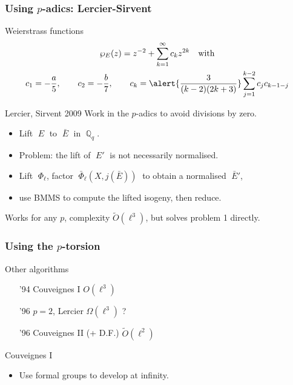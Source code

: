 \documentclass[10pt]{beamer}
\newcommand{\Q}{\mathbb{Q}}  %
\newcommand{\0}{\mathcal{O}}  %
\newcommand{\tildO}{\tilde{O}}  %
\begin{document}
\begin{frame}
  \frametitle{Using $p$-adics: Lercier-Sirvent}

  \begin{block}{Weierstrass functions}
    \vspace{-3mm}
    \begin{gather*}
      \wp_E(z) = z^{-2} + \sum_{k=1}^{\infty}c_kz^{2k} \quad\text{with}\\
      c_1 = -\frac{a}{5}, \qquad c_2 = -\frac{b}{7}, 
      \qquad c_k = \alert{\frac{3}{(k-2)(2k+3)}}\sum_{j=1}^{k-2}c_jc_{k-1-j}
    \end{gather*}
  \end{block}

  \begin{block}{Lercier, Sirvent 2009}
    Work in the $p$-adics to avoid divisions by zero.
    \begin{itemize}
    \item Lift $\;E\;$ to $\;\bar{E}\;$ in $\;\Q_q\;$.
    \item Problem: the lift of $\;E'\;$ is not necessarily normalised.
    \item Lift $\;\Phi_\ell$, factor $\;\bar{\Phi}_\ell(X,j(\bar{E}))\;$ to
      obtain a normalised $\;\bar{E}'$,
    \item use BMMS to compute the lifted isogeny, then reduce.
    \end{itemize}
    Works for any $p$, complexity $\tildO(\ell^3)$, but solves problem
    1 directly.
  \end{block}
\end{frame}


\begin{frame}
  \frametitle{Using the $p$-torsion}

  \begin{block}{Other algorithms}
    \begin{itemize}
    \item['94] Couveignes I \hfill $O(\ell^3)$
    \item['96] $p=2$, Lercier \hfill $\Omega(\ell^3)$ ?
    \item['96] Couveignes II (+ D.F.) \hfill $\tildO(\ell^2)$
    \end{itemize}
  \end{block}
  
  \begin{block}{Couveignes I}
    \begin{itemize}
    \item Use formal groups to develop at infinity.
    \end{itemize}
  \end{block}
\end{frame}
\end{document}
